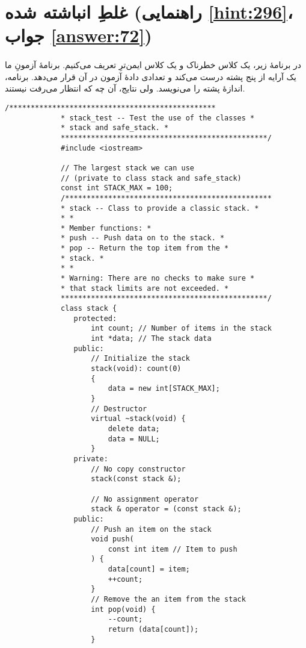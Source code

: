 \section[غلطِ انباشته شده]{غلطِ انباشته شده \protect{} (راهنمایی \ref{hint:296}، جواب \ref{answer:72})}
\paragraph{}\label{prog:91}
در برنامهٔ زیر، یک کلاس خطرناک   و یک کلاس ایمن‌ترِ  تعریف می‌کنیم. برنامهٔ آزمونِ ما یک آرایه از پنج پشته درست می‌کند و تعدادی دادهٔ آزمون در آن قرار می‌دهد. برنامه، اندازهٔ پشته را می‌نویسد. ولی نتایج، آن چه که انتظار می‌رفت نیستند.

\begin{LTR}
        \begin{lstlisting}[style=C++Style]
             /************************************************
             * stack_test -- Test the use of the classes *
             * stack and safe_stack. *
             ************************************************/
             #include <iostream>

             // The largest stack we can use
             // (private to class stack and safe_stack)
             const int STACK_MAX = 100;
             /************************************************
             * stack -- Class to provide a classic stack. *
             * *
             * Member functions: *
             * push -- Push data on to the stack. *
             * pop -- Return the top item from the *
             * stack. *
             * *
             * Warning: There are no checks to make sure *
             * that stack limits are not exceeded. *
             ************************************************/
             class stack {
             	protected:
             		int count; // Number of items in the stack
             		int *data; // The stack data
             	public:
             		// Initialize the stack
             		stack(void): count(0)
             		{
             			data = new int[STACK_MAX];
             		}
             		// Destructor
             		virtual ~stack(void) {
             			delete data;
             			data = NULL;
             		}
             	private:
             		// No copy constructor
             		stack(const stack &);

             		// No assignment operator
             		stack & operator = (const stack &);
             	public:
             		// Push an item on the stack
             		void push(
             			const int item // Item to push
             		) {
             			data[count] = item;
             			++count;
             		}
             		// Remove the an item from the stack
             		int pop(void) {
             			--count;
             			return (data[count]);
             		}


\end{lstlisting}
\end{LTR}
